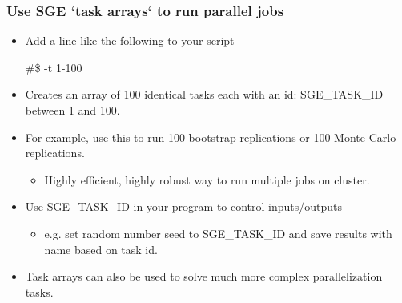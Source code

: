 \documentclass{beamer}
\begin{document}
\begin{frame}
\frametitle{Use SGE `task arrays` to run parallel jobs}
\begin{itemize}
\item Add a line like the following to your script
\begin{semiverbatim}
\#\$ -t 1-100
\end{semiverbatim}
\item Creates an array of 100 identical tasks each with an  id: SGE\_TASK\_ID between 1 and 100.
\item For example, use this to run 100 bootstrap replications or 100 Monte Carlo replications.
\begin{itemize}
\item Highly efficient, highly robust way to run multiple jobs on cluster.
\end{itemize}
\item Use SGE\_TASK\_ID in your program to control inputs/outputs
\begin{itemize}
\item e.g. set random number seed to SGE\_TASK\_ID and save results with name based on task id.
\end{itemize}
\item Task arrays can also be used to solve much more complex parallelization tasks.
\end{itemize}
\end{frame}
\end{document}
